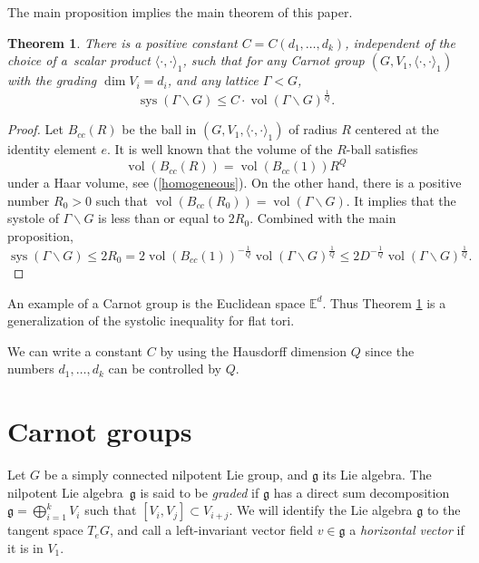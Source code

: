 \documentclass[pdftex]{sigma}
\numberwithin{equation}{section}
\newtheorem{Theorem}{Theorem}[section]
\newcommand{\g}{\mathfrak{g}}
\newcommand{\E}{\mathbb{E}}
\begin{document}
The main proposition implies the main theorem of this paper.

\begin{Theorem}\label{thmmain}
There is a positive constant $C=C(d_1,\dots,d_k)$,
independent of the choice of a~scalar product $\langle\cdot,\cdot\rangle_1$,
 such that for any Carnot group $(G,V_1,\langle\cdot,\cdot\rangle_1)$ with the grading $\dim V_i=d_i$,
and any lattice $\Gamma<G$,
\[
\operatorname{sys}(\Gamma\backslash G)\leq C\cdot \operatorname{vol}(\Gamma\backslash G)^{\frac{1}{Q}}.
\]
\end{Theorem}

\begin{proof}
Let $B_{cc}(R)$ be the ball in $(G,V_1,\langle\cdot,\cdot\rangle_1)$ of radius $R$ centered at
the identity element $e$.
It is well known that the volume of the $R$-ball satisfies
\[
\operatorname{vol}(B_{cc}(R))=\operatorname{vol}(B_{cc}(1))R^Q
\]
under a Haar volume,
see (\ref{homogeneous}).
On the other hand,
there is a positive number $R_0>0$ such that $\operatorname{vol}(B_{cc}(R_0))=\operatorname{vol}(\Gamma\backslash G)$.
It implies that the systole of $\Gamma\backslash G$ is less than or equal to $2R_0$.
Combined with the main proposition,
\[
\operatorname{sys}(\Gamma\backslash G)\leq 2R_0=2\operatorname{vol}(B_{cc}(1))^{-\frac{1}{Q}}\operatorname{vol}(\Gamma\backslash G)^{\frac{1}{Q}}\leq 2D^{-\frac{1}{Q}}\operatorname{vol}(\Gamma\backslash G)^{\frac{1}{Q}}.\tag*{\qed}
\]
\renewcommand{\qed}{}
\end{proof}

An example of a Carnot group is the Euclidean space $\E^d$.
Thus Theorem \ref{thmmain} is a generalization of the systolic inequality for flat tori.
\begin{Remark}
 We can write a constant $C$ by using the Hausdorff dimension $Q$ since the numbers $d_1,\dots,d_k$ can be controlled by $Q$.
\end{Remark}

\section{Carnot groups}\label{sec2}

Let $G$ be a simply connected nilpotent Lie group,
and $\g$ its Lie algebra.
The nilpotent Lie algebra~$\g$ is said to be \textit{graded} if $\g$ has a direct sum decomposition $\g=\bigoplus_{i=1}^k V_i$ such that $[V_i,V_j]\subset V_{i+j}$.
We will identify the Lie algebra $\g$ to the tangent space $T_eG$,
and call a left-invariant vector field $v\in \g$ a \textit{horizontal vector} if it is in $V_1$.
\end{document}
